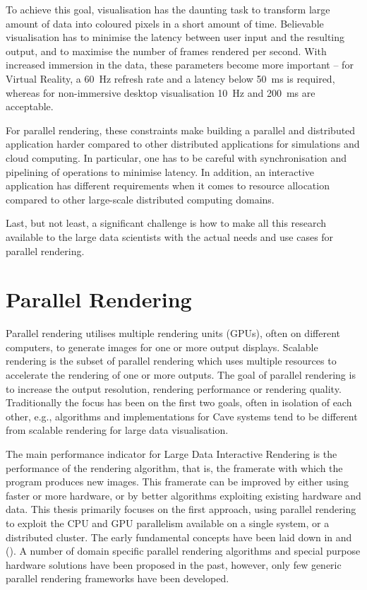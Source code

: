 To achieve this goal, visualisation has the daunting task to transform large
amount of data into coloured pixels in a short amount of time. Believable
visualisation has to minimise the latency between user input and the resulting
output, and to maximise the number of frames rendered per second. With
increased immersion in the data, these parameters become more important --
for Virtual Reality, a 60~Hz refresh rate and a latency below 50~ms is required,
whereas for non-immersive desktop visualisation 10~Hz and 200~ms are acceptable.

For parallel rendering, these constraints make building a
parallel and distributed application harder compared to other distributed
applications for simulations and cloud computing. In particular, one has to be
careful with synchronisation and pipelining of operations to minimise latency.
In addition, an interactive application has different requirements when it
comes to resource allocation compared to other large-scale distributed
computing domains.

Last, but not least, a significant challenge is how to make all this research
available to the large data scientists with the actual needs and use cases for
parallel rendering.


\section{Parallel Rendering}

Parallel rendering utilises multiple rendering units (GPUs), often on
different computers, to generate images for one or more output displays.
Scalable rendering is the subset of parallel rendering which uses multiple
resources to accelerate the rendering of one or more outputs. The goal of
parallel rendering is to increase the output resolution, rendering performance
or rendering quality. Traditionally the focus has been on the first two goals,
often in isolation of each other, e.g., algorithms and implementations for Cave
systems tend to be different from scalable rendering for large data
visualisation.

The main performance indicator for Large Data Interactive Rendering is the
performance of the rendering algorithm, that is, the framerate with which the
program produces new images. This framerate can be improved by either using
faster or more hardware, or by better algorithms exploiting existing
hardware and data. This thesis primarily focuses on the first approach, using
parallel rendering to exploit the CPU and GPU parallelism available on a single
system, or a distributed cluster. The early fundamental concepts have been laid
down in \cite{MCEF:94} and \cite{Crockett:97} (). A number of
domain specific parallel rendering algorithms and special purpose hardware
solutions have been proposed in the past, however, only few generic parallel
rendering frameworks have been developed.

